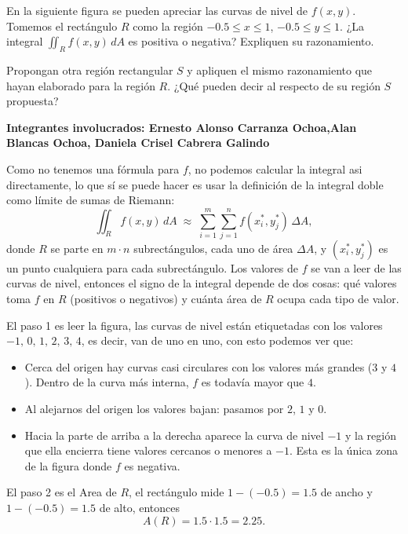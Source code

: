 \begin{ejercicio}
    En la siguiente figura se pueden apreciar las curvas de nivel de $f(x, y)$.
    Tomemos el rectángulo $R$ como la región $-0.5 \leq x \leq 1$, $-0.5 \leq y \leq 1$.
    ¿La integral $\displaystyle\iint_R f(x, y)\, dA$ es positiva o negativa?
    Expliquen su razonamiento.

    Propongan otra región rectangular $S$ y apliquen el mismo razonamiento que hayan
    elaborado para la región $R$. ¿Qué pueden decir al respecto de su región $S$ propuesta?
\end{ejercicio}

\begin{respuesta}
    \textbf{Integrantes involucrados: Ernesto Alonso Carranza Ochoa,Alan Blancas Ochoa, Daniela Crisel Cabrera Galindo}

    \bigskip
    Como no tenemos una fórmula para $f$, no podemos calcular la
    integral asi   directamente, lo que sí se puede hacer es usar la definición de la integral
    doble como límite de sumas de Riemann:
    \[
        \iint_R f(x,y)\, dA \;\approx\; \sum_{i=1}^{m}\sum_{j=1}^{n} f(x_i^*, y_j^*)\,\Delta A ,
    \]
    donde $R$ se parte en $m\cdot n$ subrectángulos, cada uno de área $\Delta A$, y
    $(x_i^*, y_j^*)$ es un punto cualquiera para cada subrectángulo. Los valores de $f$
    se van a leer de las curvas de nivel, entonces el signo de la integral depende de
    dos cosas: qué valores toma $f$ en $R$ (positivos o negativos) y cuánta área de $R$
    ocupa cada tipo de valor.

    \bigskip
    El paso 1 es leer la figura, las curvas de nivel están etiquetadas con los valores
    $-1,\,0,\,1,\,2,\,3,\,4$, es decir, van de uno en uno, con esto podemos ver que:
    \begin{itemize}
        \item Cerca del origen hay curvas casi circulares con los valores más grandes
              ($3$ y $4$). Dentro de la curva más interna, $f$ es todavía mayor que $4$.
        \item Al alejarnos del origen los valores bajan: pasamos por $2$, $1$ y $0$.
        \item Hacia la parte de arriba a la derecha aparece la curva de nivel $-1$ y
              la región que ella encierra tiene valores cercanos o menores a $-1$.
              Esta es la única zona de la figura donde $f$ es negativa.
    \end{itemize}


    \bigskip
    El paso 2 es el Area de $R$, el rectángulo mide $1-(-0.5)=1.5$ de ancho y
    $1-(-0.5)=1.5$ de alto, entonces
    \[
        A(R) = 1.5 \cdot 1.5 = 2.25 .
    \]


\end{respuesta}
